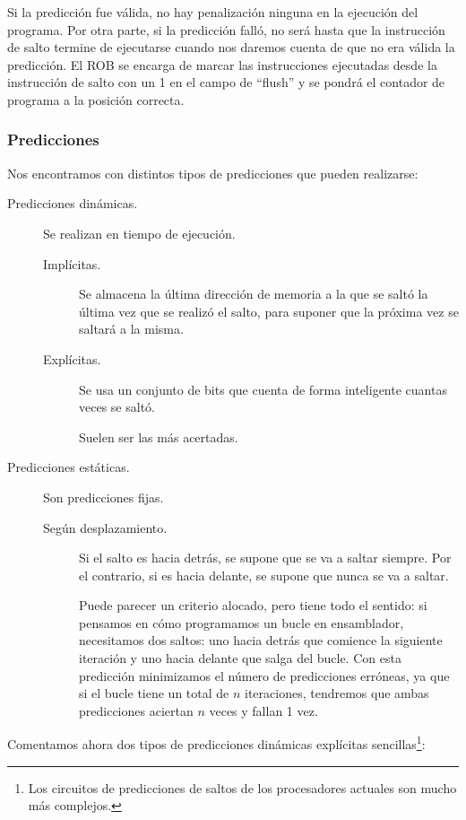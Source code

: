 Si la predicción fue válida, no hay penalización ninguna en la ejecución del programa. Por otra parte, si la predicción falló, no será hasta que la instrucción de salto termine de ejecutarse cuando nos daremos cuenta de que no era válida la predicción. El ROB se encarga de marcar las instrucciones ejecutadas desde la instrucción de salto con un 1 en el campo de ``flush'' y se pondrá el contador de programa a la posición correcta.

\subsubsection{Predicciones}
Nos encontramos con distintos tipos de predicciones que pueden realizarse:
\begin{description}
    \item [Predicciones dinámicas.] Se realizan en tiempo de ejecución.
        \begin{description}
            \item [Implícitas.] Se almacena la última dirección de memoria a la que se saltó la última vez que se realizó el salto, para suponer que la próxima vez se saltará a la misma.
            \item [Explícitas.] Se usa un conjunto de bits que cuenta de forma inteligente cuantas veces se saltó.

                Suelen ser las más acertadas.
        \end{description}
    \item [Predicciones estáticas.] Son predicciones fijas.
        \begin{description}
            \item [Según desplazamiento.] Si el salto es hacia detrás, se supone que se va a saltar siempre. Por el contrario, si es hacia delante, se supone que nunca se va a saltar.

                Puede parecer un criterio alocado, pero tiene todo el sentido: si pensamos en cómo programamos un bucle en ensamblador, necesitamos dos saltos: uno hacia detrás que comience la siguiente iteración y uno hacia delante que salga del bucle. Con esta predicción minimizamos el número de predicciones erróneas, ya que si el bucle tiene un total de $n$ iteraciones, tendremos que ambas predicciones aciertan $n$ veces y fallan 1 vez.
        \end{description}
\end{description}
Comentamos ahora dos tipos de predicciones dinámicas explícitas sencillas\footnote{Los circuitos de predicciones de saltos de los procesadores actuales son mucho más complejos.}:
